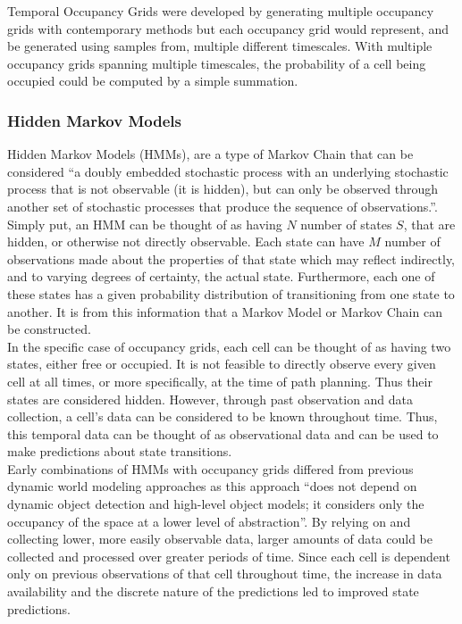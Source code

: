   Temporal Occupancy Grids were developed by generating multiple occupancy
  grids with contemporary methods but each occupancy grid
  would represent, and be generated using samples from, multiple different timescales.
  With multiple occupancy grids spanning multiple timescales, the
  probability of a cell being occupied could be computed by a simple summation. \\

  \subsubsection{ Hidden Markov Models }

  Hidden Markov Models (HMMs), are a type of Markov Chain that can be considered
  \cite{Rabiner1989}``a doubly embedded stochastic process with an underlying stochastic process that is not observable (it is hidden), but can only be observed through another set of stochastic processes that produce the sequence of observations.''.
  Simply put, an HMM can be thought of as having $N$
  number of states $S$, that are hidden, or otherwise not directly observable.
  Each state can have $M$ number of observations made about the properties of that state which
  may reflect indirectly, and to varying degrees of certainty, the actual state.
  Furthermore, each one of these states has a given probability distribution of
  transitioning from one state to another. It is from this information that a
  Markov Model or Markov Chain can be constructed. \\

  In the specific case of occupancy grids, each cell can be thought of as having two
  states, either free or occupied. It is not feasible to directly observe
  every given cell at all times, or more specifically, at the time of path planning.
  Thus their states are considered hidden. However, through past
  observation and data collection, a cell's data can be considered to be known
  throughout time. Thus, this temporal data can be thought of as observational data and
  can be used to make predictions about state transitions. \\

  Early combinations of HMMs with occupancy grids differed from previous dynamic
  world modeling approaches as this approach \cite{Meyer-Delius2012} ``does not depend on dynamic object detection and high-level object models; it considers only the occupancy of the space at a lower level of abstraction''. By relying on
  and collecting lower, more easily observable data, larger amounts of data could
  be collected and processed over greater periods of time. Since each cell is
  dependent only on previous observations of that cell throughout time, the
  increase in data availability and the discrete nature of the predictions led to
  improved state predictions. \\

